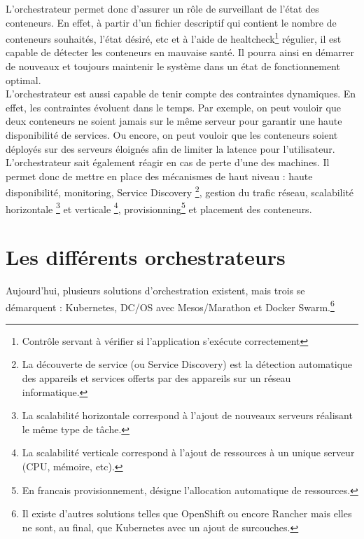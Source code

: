 \documentclass[11pt,fleqn]{book} %
\begin{document}
L'orchestrateur permet donc d'assurer un rôle de surveillant de l'état des conteneurs. En effet, à partir d'un fichier descriptif qui contient le nombre de conteneurs souhaités, l'état désiré, etc et à l'aide de healtcheck\footnote{Contrôle servant à vérifier si l'application s'exécute correctement} régulier, il est capable de détecter les conteneurs en mauvaise santé. Il pourra ainsi en démarrer de nouveaux et toujours maintenir le système dans un état de fonctionnement optimal.\\
L'orchestrateur est aussi capable de tenir compte des contraintes dynamiques. En effet, les contraintes évoluent dans le temps. Par exemple, on peut vouloir que deux conteneurs ne soient jamais sur le même serveur pour garantir une haute disponibilité de services. Ou encore, on peut vouloir que les conteneurs soient déployés sur des serveurs éloignés afin de limiter la latence pour l'utilisateur. L'orchestrateur sait également réagir en cas de perte d'une des machines. Il permet donc de mettre en place des mécanismes de haut niveau : haute disponibilité, monitoring, Service Discovery \footnote{La découverte de service (ou Service Discovery) est la détection automatique des appareils et services offerts par des appareils sur un réseau informatique.}, gestion du trafic réseau,  scalabilité horizontale \footnote{La scalabilité horizontale correspond à l'ajout de nouveaux serveurs réalisant le même type de tâche.} et verticale \footnote{La scalabilité verticale correspond à l'ajout de ressources à un unique serveur (CPU, mémoire, etc).}, provisionning\footnote{En francais provisionnement, désigne l'allocation automatique de ressources.} et placement des conteneurs.\\



\section{Les différents orchestrateurs}
Aujourd'hui, plusieurs solutions d'orchestration existent, mais trois se démarquent : Kubernetes, DC/OS avec Mesos/Marathon et  Docker Swarm.\footnote{Il existe d'autres solutions telles que OpenShift ou encore Rancher mais elles ne sont, au final, que Kubernetes avec un ajout de surcouches.}
\end{document}
